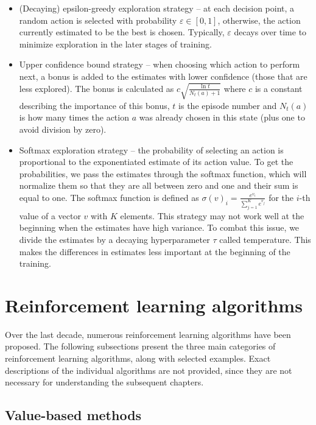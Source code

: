 \documentclass[
  digital,     %
  oneside,     %
  nosansbold,  %
  nocolorbold, %
  lof,         %
  lot,         %
]{fithesis4}
\begin{document}
\begin{itemize}
    \item (Decaying) epsilon-greedy exploration strategy -- at each decision point, a random action is selected with probability $\varepsilon \in [0,1]$, otherwise, the action currently estimated to be the best is chosen. Typically, $\varepsilon$ decays over time to minimize exploration in the later stages of training.
    \item Upper confidence bound strategy -- when choosing which action to perform next, a bonus is added to the estimates with lower confidence (those that are less explored). The bonus is calculated as $c\sqrt{\frac{\ln{t}}{N_t(a)+1}}$ where $c$ is a constant describing the importance of this bonus, $t$ is the episode number and $N_t(a)$ is how many times the action $a$ was already chosen in this state (plus one to avoid division by zero).
    \item Softmax exploration strategy -- the probability of selecting an action is proportional to the exponentiated estimate of its action value. To get the probabilities, we pass the estimates through the softmax function, which will normalize them so that they are all between zero and one and their sum is equal to one. The softmax function is defined as $\sigma (v)_i = \frac{e^{v_i}}{\sum^{K}_{j=1}e^{v_j}}$ for the $i$-th value of a vector $v$ with $K$ elements. This strategy may not work well at the beginning when the estimates have high variance. To combat this issue, we divide the estimates by a decaying hyperparameter $\tau$ called temperature. This makes the differences in estimates less important at the beginning of the training.
\end{itemize}



\section{Reinforcement learning algorithms}
\label{sec:algos}

Over the last decade, numerous reinforcement learning algorithms have been proposed. The following subsections present the three main categories of reinforcement learning algorithms, along with selected examples. Exact descriptions of the individual algorithms are not provided, since they are not necessary for understanding the subsequent chapters.

\subsection{Value-based methods}
\label{subsec:value-based-methods}
\end{document}
